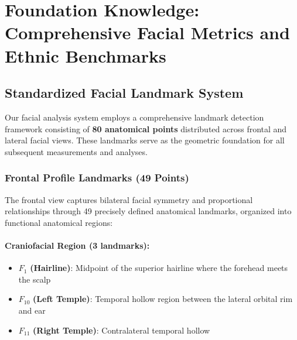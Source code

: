 \section{Foundation Knowledge: Comprehensive Facial Metrics and Ethnic Benchmarks}

\subsection{Standardized Facial Landmark System}

Our facial analysis system employs a comprehensive landmark detection framework consisting of \textbf{80 anatomical points} distributed across frontal and lateral facial views. These landmarks serve as the geometric foundation for all subsequent measurements and analyses.

\subsubsection{Frontal Profile Landmarks (49 Points)}

The frontal view captures bilateral facial symmetry and proportional relationships through 49 precisely defined anatomical landmarks, organized into functional anatomical regions:

\paragraph{Craniofacial Region (3 landmarks):}
\begin{itemize}
    \item $F_1$ \textbf{(Hairline)}: Midpoint of the superior hairline where the forehead meets the scalp
    \item $F_{10}$ \textbf{(Left Temple)}: Temporal hollow region between the lateral orbital rim and ear
    \item $F_{11}$ \textbf{(Right Temple)}: Contralateral temporal hollow
\end{itemize}

